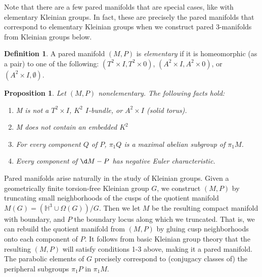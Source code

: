 \documentclass[12pt]{amsart}
\newtheorem{prop}[theorem]{Proposition}
\theoremstyle{definition}
\newtheorem{Def}[theorem]{Definition}
\newcommand{\x}{\times}
\newcommand{\Om}{\Omega}
\begin{document}
Note that there are a few pared manifolds that are special cases,
like with elementary Kleinian groups. In fact, these are precisely the pared
manifolds that correspond to elementary Kleinian groups when we construct pared
3-manifolds from Kleinian groups below.

\begin{Def}

A pared manifold $(M,P)$ is \emph{elementary} if it is homeomorphic (as a pair)
to one of the following: $(T^2\x I,T^2\x 0)$, $(A^2\x I,A^2\x 0)$, or $(A^2\x
I,\emptyset)$.

\end{Def}

\begin{prop}

Let $(M,P)$ nonelementary. The following facts hold:

\begin{enumerate}
\item M is not a $T^2\x I$, $K^2$ $I$-bundle, or $A^2\x I$ (solid torus).
\item M does not contain an embedded $K^2$
\item For every component $Q$ of $P$, $\pi_1Q$ is a maximal abelian subgroup of
$\pi_1M$.
\item Every component of $\d M-P$ has negative Euler characteristic.
\end{enumerate}

\end{prop}

Pared manifolds arise naturally in the study of Kleinian groups. Given
a geometrically finite torsion-free Kleinian group $G$, we construct $(M,P)$ by
truncating small neighborhoods of the cusps of the quotient manifold $M(G)
= \left(\mathbb{H}^3\cup \Om(G)\right)/G$.  Then we let $M$ be the resulting
compact manifold with boundary, and $P$ the boundary locus along which we
truncated.  That is, we can rebuild the quotient manifold from $(M,P)$ by
gluing cusp neighborhoods onto each component of $P$. It follows from basic
Kleinian group theory that the resulting $(M,P)$ will satisfy conditions 1-3
above, making it a pared manifold.  The parabolic elements of $G$ precisely
correspond to (conjugacy classes of) the peripheral subgroups $\pi_1P$ in
$\pi_1M$.
\end{document}
